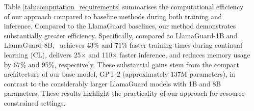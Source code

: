 Table \ref{tab:computation_requirements} summarises the computational efficiency of our approach compared to baseline methods during both training and inference.
Compared to the LlamaGuard baselines, our method demonstrates substantially greater efficiency.
Specifically, compared to LlamaGuard-1B and LlamaGuard-8B, \ourapp~achieves 43\% and 71\% faster training times during continual learning (CL), delivers 25× and 110× faster inference, and reduces memory usage by 67\% and 95\%, respectively.
These substantial gains stem from the compact architecture of our base model, GPT-2 (approximately 137M parameters), in contrast to the considerably larger LlamaGuard models with 1B and 8B parameters.
These results highlight the practicality of our approach for resource-constrained settings.